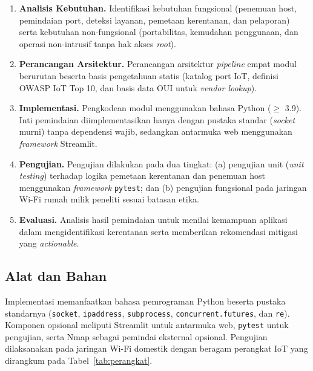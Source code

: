 \begin{enumerate}
    \item \textbf{Analisis Kebutuhan.} Identifikasi kebutuhan fungsional
    (penemuan host, pemindaian port, deteksi layanan, pemetaan
    kerentanan, dan pelaporan) serta kebutuhan non-fungsional
    (portabilitas, kemudahan penggunaan, dan operasi non-intrusif tanpa
    hak akses \textit{root}).

    \item \textbf{Perancangan Arsitektur.} Perancangan arsitektur
    \textit{pipeline} empat modul berurutan beserta basis pengetahuan
    statis (katalog port IoT, definisi OWASP IoT Top 10, dan basis data
    OUI untuk \textit{vendor lookup}).

    \item \textbf{Implementasi.} Pengkodean modul menggunakan bahasa
    Python ($\geq$ 3.9). Inti pemindaian diimplementasikan hanya dengan
    pustaka standar (\textit{socket} murni) tanpa dependensi wajib,
    sedangkan antarmuka web menggunakan \textit{framework} Streamlit.

    \item \textbf{Pengujian.} Pengujian dilakukan pada dua tingkat:
    (a) pengujian unit (\textit{unit testing}) terhadap logika pemetaan
    kerentanan dan penemuan host menggunakan \textit{framework}
    \texttt{pytest}; dan (b) pengujian fungsional pada jaringan Wi-Fi
    rumah milik peneliti sesuai batasan etika.

    \item \textbf{Evaluasi.} Analisis hasil pemindaian untuk menilai
    kemampuan aplikasi dalam mengidentifikasi kerentanan serta
    memberikan rekomendasi mitigasi yang \textit{actionable}.
\end{enumerate}

\subsection{Alat dan Bahan}
Implementasi memanfaatkan bahasa pemrograman Python beserta pustaka
standarnya (\texttt{socket}, \texttt{ipaddress}, \texttt{subprocess},
\texttt{concurrent.futures}, dan \texttt{re}). Komponen opsional meliputi
Streamlit untuk antarmuka web, \texttt{pytest} untuk pengujian, serta
Nmap sebagai pemindai eksternal opsional. Pengujian dilaksanakan pada
jaringan Wi-Fi domestik dengan beragam perangkat IoT yang dirangkum pada
Tabel~\ref{tab:perangkat}.


